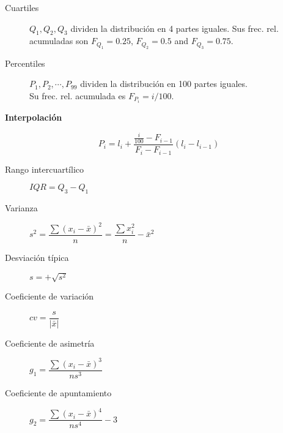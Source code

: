\begin{multicols*}{2}
\begin{tcolorbox}[hbox, title=Estadísticos de posición]
\begin{minipage}{0.4\textwidth}
\begin{description}
\item [Cuartiles] $Q_1,Q_2,Q_3$ dividen la distribución en 4 partes iguales.
      Sus frec. rel. acumuladas son
      $F_{Q_1}=0.25$, $F_{Q_2}=0.5$ and $F_{Q_3}=0.75$.
\item [Percentiles] $P_1,P_2,\cdots,P_{99}$ dividen la distribución en 100 partes iguales.\\
      Su frec. rel. acumulada es $F_{P_i}=i/100$.
\end{description}
\textbf{Interpolación}

\resizebox{\textwidth}{!}{}

\[P_i=l_i+\frac{\frac{i}{100}-F_{i-1}}{F_i-F_{i-1}}(l_i-l_{i-1})\]
\end{minipage}
\end{tcolorbox}

\begin{tcolorbox}[hbox, title=Estadísticos de dispersión]
\begin{minipage}{0.4\textwidth}
\begin{description}
\item [Rango intercuartílico] $IQR=Q_3-Q_1$
\item [Varianza] $s^2=\dfrac{\sum (x_i-\bar x)^2}{n}=\dfrac{\sum x_i^2}{n}-\bar x^2$
\item [Desviación típica] $s=+\sqrt{s^2}$
\item [Coeficiente de variación] $cv=\dfrac{s}{|\bar{x}|}$
\end{description}
\end{minipage}
\end{tcolorbox}

\begin{tcolorbox}[hbox, title=Estadísticos de forma]
\begin{minipage}{0.4\textwidth}
\begin{description}
\item [Coeficiente de asimetría] $g_1=\dfrac{\sum(x_i-\bar{x})^3}{ns^3}$
\item [Coeficiente de apuntamiento] $g_2=\dfrac{\sum(x_i-\bar{x})^4}{ns^4}-3$
\end{description}
\end{minipage}
\end{tcolorbox}


\end{multicols*}
